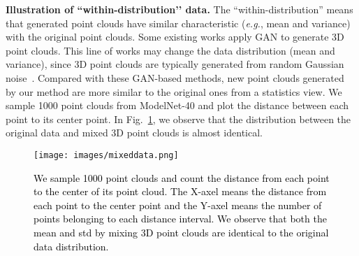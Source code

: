 \documentclass[journal]{IEEEtran}
\def\eg{\emph{e.g.}}
\begin{document}
\textbf{Illustration of {``within-distribution’’} data.}
The “within-distribution” means that generated point clouds have similar characteristic (\eg, mean and variance) with the original point clouds. Some existing works apply GAN to generate 3D point clouds. This line of works may change the data distribution (mean and variance), since 3D point clouds are typically generated from random Gaussian noise~\cite{zhang2021unsupervised, shu20193d, li2019pu}. Compared with these GAN-based methods, new point clouds generated by our method are more similar to the original ones from a statistics view. We sample 1000 point clouds from ModelNet-40 and plot the distance between each point to its center point. 
In Fig.~\ref{fig:mixdata}, we observe that the distribution between the original data and mixed 3D point clouds is almost identical.



\begin{figure}[t]
\begin{center}
\texttt{[image: images/mixeddata.png]}
\end{center}
\vspace{-.15in}
   \caption{\textcolor{black}{We sample 1000 point clouds and count the distance from each point to the center of its point cloud. The X-axel means the distance from each point to the center point and the Y-axel means the number of points belonging to each distance interval. We observe that both the mean and std by mixing 3D point clouds are identical to the original data distribution.}
}
\label{fig:mixdata}
\end{figure}


\setlength{\tabcolsep}{15pt}
\begin{table}[t]{
\caption{
We select 20 classes of 40 categories on ModelNet-40 for pre-training, and the rest 20 classes for fine-tuning and testing.
The accuracy of our method surpasses the model trained from scratch by a clear margin.} \label{table:rest}
{
}}
\end{table}
\end{document}
